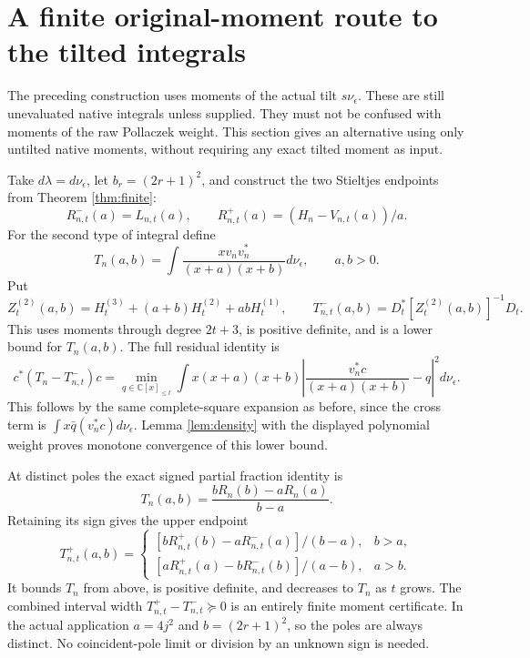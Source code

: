 \documentclass[11pt]{article}
\newcommand{\C}{\mathbb C}
\begin{document}
\section{A finite original-moment route to the tilted integrals}

The preceding construction uses moments of the actual tilt
$s\nu_\epsilon$.  These are still unevaluated native integrals unless
supplied.  They must not be confused with moments of the raw Pollaczek
weight.  This section gives an alternative using only untilted native
moments, without requiring any exact tilted moment as input.

Take $d\lambda=d\nu_\epsilon$, let $b_r=(2r+1)^2$, and construct
the two Stieltjes endpoints from Theorem \ref{thm:finite}:
\[
 R_{n,t}^-(a)=L_{n,t}(a),\qquad
 R_{n,t}^+(a)=(H_n-V_{n,t}(a))/a.
\]
For the second type of integral define
\[
 T_n(a,b)=\int\frac{xv_nv_n^*}{(x+a)(x+b)}d\nu_\epsilon,
 \qquad a,b>0.
\]
Put
\begin{equation}\label{eq:quadraticlower}
 Z_t^{(2)}(a,b)=H_t^{(3)}+(a+b)H_t^{(2)}+abH_t^{(1)},
 \qquad T_{n,t}^-(a,b)=D_t^*[Z_t^{(2)}(a,b)]^{-1}D_t.
\end{equation}
This uses moments through degree $2t+3$, is positive definite, and
is a lower bound for $T_n(a,b)$.  The full residual identity is
\begin{equation}\label{eq:quadres}
 c^*(T_n-T_{n,t}^-)c
 =\min_{q\in\C[x]_{\le t}}
 \int x(x+a)(x+b)
 \left|\frac{v_n^*c}{(x+a)(x+b)}-q\right|^2d\nu_\epsilon.
\end{equation}
This follows by the same complete-square expansion as before, since
the cross term is $\int x\bar q(v_n^*c)d\nu_\epsilon$.
Lemma \ref{lem:density} with the displayed polynomial weight proves
monotone convergence of this lower bound.

At distinct poles the exact signed partial fraction identity is
\begin{equation}\label{eq:partialfraction}
 T_n(a,b)=\frac{bR_n(b)-aR_n(a)}{b-a}.
\end{equation}
Retaining its sign gives the upper endpoint
\begin{equation}\label{eq:quadraticupper}
 T_{n,t}^+(a,b)=
 \begin{cases}
 [bR_{n,t}^+(b)-aR_{n,t}^-(a)]/(b-a),&b>a,\\[1mm]
 [aR_{n,t}^+(a)-bR_{n,t}^-(b)]/(a-b),&a>b.
 \end{cases}
\end{equation}
It bounds $T_n$ from above, is positive definite, and decreases
to $T_n$ as $t$ grows.  The combined interval width
$T_{n,t}^+-T_{n,t}^-\succeq0$ is an entirely finite moment
certificate.  In the actual application $a=4j^2$ and
$b=(2r+1)^2$, so the poles are always distinct.  No coincident-pole
limit or division by an unknown sign is needed.
\end{document}
